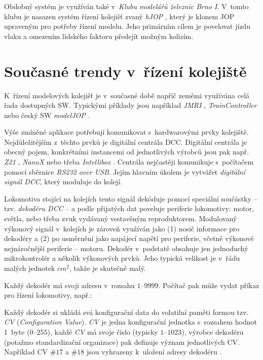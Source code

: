 Obdobný systém je využíván také v~\textit{Klubu modelářů železnic Brno I}.
V~tomto klubu je nasazen systém řízení kolejišť zvaný \textit{hJOP}
\cite{hjop:web}, který je klonem JOP upraveným pro potřeby řízení modelu. Jeho
primárním cílem je povelovat jízdu vlaku a omezením lidského faktoru předejít
možným kolizím.

\section{Současné trendy v~řízení kolejiště}
\label{sec:trendy}

K~řízení modelových kolejišť je v~současné době napříč zeměmi využívána celá
řada dostupných SW. Typickými příklady jsou například \textit{JMRI}
\cite{jmri:web}, \textit{TrainController} \cite{traincontroller:web}
nebo český SW \textit{modelJOP} \cite{modeljop:web}.

Výše zmíněné aplikace potřebují komunikovat s~hardwarovými prvky kolejiště.
Nejdůležitějším z~těchto prvků je digitální centrála DCC. Digitální centrála je
obecný pojem, konkrétními instancemi od jednotlivých výrobců jsou pak např.
\textit{Z21} \cite{z21:web}, \textit{NanoX} \cite{nanox:web} nebo třeba
\textit{Intellibox} \cite{intellibox:web}. Centrála nejčastěji komunikuje
s~počítačem pomocí sběrnice \textit{RS232 over USB}. Jejím hlavním úkolem je
vytvářet \textit{digitální signál DCC}, který moduluje do kolejí.

Lokomotiva stojící na kolejích tento signál dekóduje pomocí spe\-ciál\-ní
součástky -- tzv. \textit{dekodéru DCC} -- a podle přijatých dat poveluje
periferie lokomotivy: motor, světla, nebo třeba zvuk vydávaný vestavěným
reproduktorem. Modulovaný výkonový signál v~kolejích je zároveň využíván jako
(1) nosič informace pro dekodéry a (2) po usměrnění jako napájecí napětí pro
periferie, včetně výkonově nejnáročnější periferie -- motoru. Dekodér
v~podstatě obsahuje jen jednoduchý mikrokontrolér a několik výkonových prvků.
Jeho typická velikost je v~řádu malých jednotek $cm^2$, takže je skutečně malý.

Každý dekodér má svoji adresu v~rozsahu $1$--$9999$. Počítač pak může vydat příkaz
pro řízení lokomotivy, např.: \textit{}

Každý dekodér si ukládá svá konfigurační data do volatilní paměti formou tzv.
\textit{CV} (\textit{Configuration Value}). \textit{CV} je jedna konfigurační
jednotka s~rozsahem hodnot 1~byte ($0$--$255$), každé \textit{CV} má svoje číslo
(typicky $1$--$1023$), výrobce dekodéru (potažmo standardizační organizace) pak
definuje význam jednotlivých CV. Například CV $\#17$ a $\#18$ jsou vyhrazeny
k~uložení adresy dekodéru \cite{zimo:cvs}.

